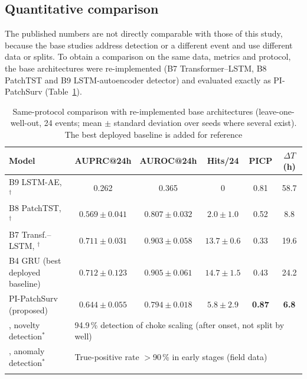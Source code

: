 \subsection{Quantitative comparison}

The published numbers are not directly comparable with those of this study, because the base studies
address detection or a different event and use different data or splits. To obtain a comparison on the same
data, metrics and protocol, the base architectures were re-implemented (B7 Transformer--LSTM, B8 PatchTST and
B9 LSTM-autoencoder detector) and evaluated exactly as PI-PatchSurv (Table~\ref{tab:quant}).

\begin{table}[t]
\caption{Same-protocol comparison with re-implemented base architectures (leave-one-well-out, 24 events;
mean $\pm$ standard deviation over seeds where several exist). The best deployed baseline is added for
reference}
\label{tab:quant}
\footnotesize\setlength{\tabcolsep}{2.5pt}
\begin{tabular*}{\textwidth}{@{\extracolsep\fill}lccccc}
\toprule
Model & AUPRC@24h & AUROC@24h & Hits/24 & PICP & $\Delta T$ (h) \\
\midrule
B9 LSTM-AE, \citeauthor{aranha2024}$^\dagger$ & 0.262 & 0.365 & 0 & 0.81 & 58.7 \\
B8 PatchTST, \citeauthor{nie2023}$^\dagger$ & $0.569\pm0.041$ & $0.807\pm0.032$ & $2.0\pm1.0$ & 0.52 & 8.8 \\
B7 Transf.--LSTM, \citeauthor{lai2026}$^\dagger$ & $0.711\pm0.031$ & $0.903\pm0.058$ & $13.7\pm0.6$ & 0.33 & 19.6 \\
B4 GRU (best deployed baseline) & $0.712\pm0.123$ & $0.905\pm0.061$ & $14.7\pm1.5$ & 0.43 & 24.2 \\
PI-PatchSurv (proposed) & $0.644\pm0.055$ & $0.794\pm0.018$ & $5.8\pm2.9$ & \textbf{0.87} & \textbf{6.8} \\
\midrule
\citet{lopes2026}, novelty detection$^*$ & \multicolumn{5}{l}{94.9\,\% detection of choke scaling (after onset, not split by well)} \\
\citet{aranha2024}, anomaly detection$^*$ & \multicolumn{5}{l}{True-positive rate $>$90\,\% in early stages (field data)} \\
\botrule
\end{tabular*}
\end{table}

